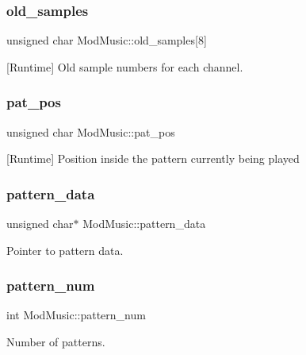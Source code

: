 \subsubsection{\texorpdfstring{old\+\_\+samples}{old\_samples}}
{\footnotesize\ttfamily unsigned char Mod\+Music\+::old\+\_\+samples\mbox{[}8\mbox{]}}



\mbox{[}Runtime\mbox{]} Old sample numbers for each channel. 

\mbox{\label{structModMusic_a2dc34fe1aa5c7fd23be5f6dfbd47fa7d}} 
\subsubsection{\texorpdfstring{pat\+\_\+pos}{pat\_pos}}
{\footnotesize\ttfamily unsigned char Mod\+Music\+::pat\+\_\+pos}



\mbox{[}Runtime\mbox{]} Position inside the pattern currently being played 

\mbox{\label{structModMusic_a4f279f645c007e434d897b480510e748}} 
\subsubsection{\texorpdfstring{pattern\+\_\+data}{pattern\_data}}
{\footnotesize\ttfamily unsigned char$\ast$ Mod\+Music\+::pattern\+\_\+data}



Pointer to pattern data. 

\mbox{\label{structModMusic_a94311ad25e92db0711cc9dfb5f25103d}} 
\subsubsection{\texorpdfstring{pattern\+\_\+num}{pattern\_num}}
{\footnotesize\ttfamily int Mod\+Music\+::pattern\+\_\+num}



Number of patterns. 

